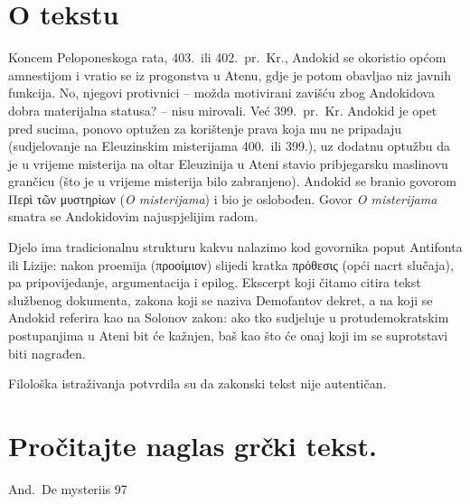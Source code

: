 \section*{O tekstu}

Koncem Peloponeskoga rata, 403.\ ili 402.\ pr.~Kr., Andokid se okoristio općom amnestijom i vratio se iz progonstva u Atenu, gdje je potom obavljao niz javnih funkcija. No, njegovi protivnici – možda motivirani zavišću zbog Andokidova dobra materijalna statusa? – nisu mirovali. Već 399.\ pr.~Kr. Andokid je opet pred sucima, ponovo optužen za korištenje prava koja mu ne pripadaju (sudjelovanje na Eleuzinskim misterijama 400.\ ili 399.), uz dodatnu optužbu da je u vrijeme misterija na oltar Eleuzinija u Ateni stavio pribjegarsku maslinovu grančicu (što je u vrijeme misterija bilo zabranjeno). Andokid se branio govorom \textgreek[variant=ancient]{Περὶ τῶν μυστηρίων} (\textit{O misterijama}) i bio je oslobođen. Govor \textit{O misterijama} smatra se Andokidovim najuspjelijim radom.

Djelo ima tradicionalnu strukturu kakvu nalazimo kod govornika poput Antifonta ili Lizije: nakon proemija \textgreek[variant=ancient]{(προοίμιον)} slijedi kratka \textgreek[variant=ancient]{πρόθεσις} (opći nacrt slučaja), pa pripovijedanje, argumentacija i epilog. Ekscerpt koji čitamo citira tekst službenog dokumenta, zakona koji se naziva Demofantov dekret, a na koji se Andokid referira kao na Solonov zakon: ako tko sudjeluje u protudemokratskim postupanjima u Ateni bit će kažnjen, baš kao što će onaj koji im se suprotstavi biti nagrađen.

Filološka istraživanja potvrdila su da zakonski tekst nije autentičan.



\newpage

\section*{Pročitajte naglas grčki tekst.}

And.\ De mysteriis 97


\medskip


